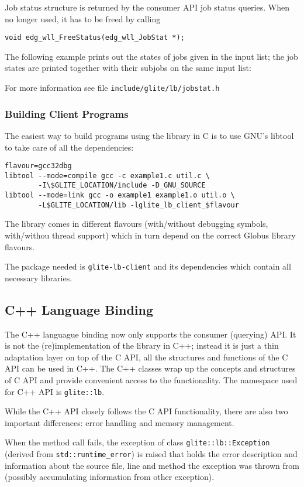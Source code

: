 Job status structure is returned by the \LB consumer API job status
queries. When no longer used, it has to be freed by calling
\begin{lstlisting}
void edg_wll_FreeStatus(edg_wll_JobStat *);
\end{lstlisting}

The following example prints out the states of jobs given in the input
list; the job states are printed together with their subjobs on the
same input list:


For more information see file \verb'include/glite/lb/jobstat.h'

\subsubsection{Building Client Programs}
The easiest way to build programs using the \LB library in C is to use
GNU's libtool to take care of all the dependencies:
\begin{verbatim}
flavour=gcc32dbg
libtool --mode=compile gcc -c example1.c util.c \
        -I\$GLITE_LOCATION/include -D_GNU_SOURCE
libtool --mode=link gcc -o example1 example1.o util.o \
        -L$GLITE_LOCATION/lib -lglite_lb_client_$flavour
\end{verbatim}
The library comes in different flavours (with/without debugging
symbols, with/withou thread support) which in turn depend on the
correct Globus library flavours.

The package needed is \texttt{glite-lb-client} and its dependencies which contain all necessary libraries.

\subsection{C++ Language Binding}
The C++ languague binding now only supports the consumer (querying)
API. It is not the (re)implementation of the library in C++; instead
it is just a thin adaptation layer on top of the C API, \ie all the
structures and functions of the C API can be used in C++. The C++
classes wrap up the concepts and structures of C API and provide
convenient access to the functionality. The namespace used for 
\LB C++ API is \verb'glite::lb'.

%
While the C++ API closely follows the C API functionality, there are
also two important differences: error handling and memory management.

When the \LB method call fails, the exception of class 
\verb'glite::lb::Exception' (derived from \verb'std::runtime_error')
is raised that holds the error description and information about the
source file, line and method the exception was thrown from (possibly
accumulating information from other exception). 

